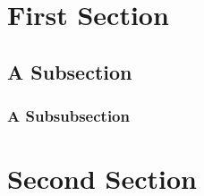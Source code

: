 \documentclass[twoside, english]{reports/assets/sdqtechreport}
\begin{document}
\section{First Section}
\label{sec:SecondContent:FirstSection}

\Blindtext

\subsection{A Subsection}
\label{sec:SecondContent:FirstSubSection}

\Blindtext

\subsubsection{A Subsubsection}

\Blindtext[1]

\section{Second Section}
\label{sec:SecondContent:SecondSection}

\Blindtext

\end{document}
